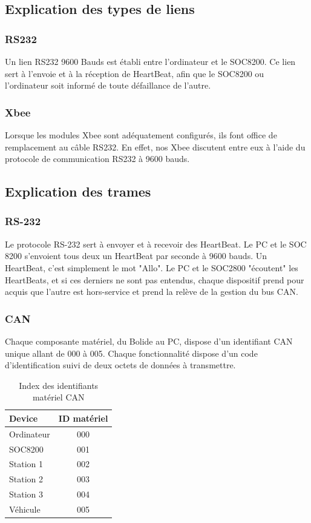 \documentclass[10pt,a4paper,final]{article}
\begin{document}
\begin{spacing}{1.5}
\subsection{Explication des types de liens}
\subsubsection{RS232}
Un lien RS232 9600 Bauds est établi entre l'ordinateur et le SOC8200. Ce lien sert à l'envoie et à la réception de HeartBeat, afin que le SOC8200 ou l'ordinateur soit informé de toute défaillance de l'autre.

\subsubsection{Xbee}
Lorsque les modules Xbee sont adéquatement configurés, ils font office de remplacement au câble RS232. En effet, nos Xbee discutent entre eux à l'aide du protocole de communication RS232 à 9600 bauds.  

\subsection{Explication des trames}
\subsubsection{RS-232}
Le protocole RS-232 sert à envoyer et à recevoir des HeartBeat. Le PC et le SOC 8200 s'envoient tous deux un HeartBeat par seconde à 9600 bauds. Un HeartBeat, c'est simplement le mot "Allo". Le PC et le SOC2800 "écoutent" les HeartBeats, et si ces derniers ne sont pas entendus, chaque dispositif prend pour acquis que l'autre est hors-service et prend la relève de la gestion du bus CAN.
\pagebreak
\subsubsection{CAN}
Chaque composante matériel, du Bolide au PC, dispose d'un identifiant CAN unique allant de 000 à 005. Chaque fonctionnalité dispose d'un code d'identification suivi de deux octets de données à transmettre.

\begin{table}[!ht]
\caption{Index des identifiants matériel CAN}
\medskip
\centering
\begin{tabular}{|l|c|}
\hline 
\textbf{Device} & \textbf{ID matériel} \\ 
\hline 
Ordinateur & 000 \\ 
\hline 
SOC8200 & 001 \\ 
\hline 
Station 1 & 002 \\ 
\hline 
Station 2  & 003 \\ 
\hline
Station 3  & 004 \\
\hline 
Véhicule  & 005 \\ 
\hline 
\end{tabular} 
\label{tab:testtab1}
\end{table} 



\end{spacing}
\end{document}
